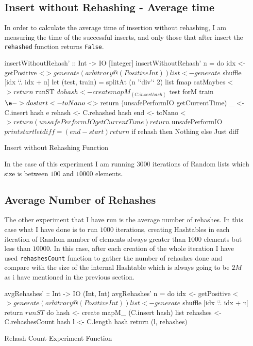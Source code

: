 \documentclass[12pt, a4paper]{article}
\begin{document}
\subsection{Insert without Rehashing - Average time}\label{sec:ins}
In order to calculate the average time of insertion without rehashing, I am measuring the time of the successful inserts, and only those that after insert the \texttt{rehashed} function returns \texttt{False}.

\begin{listing}[H]
\begin{haskellcode*}{}
insertWithoutRehash' :: Int -> IO [Integer]
insertWithoutRehash' n = do
  idx <- getPositive <$> generate (arbitrary @(Positive Int))
  list <- generate $ shuffle [idx `.`. idx + n]
  let (test, train) = splitAt (n '`div'` 2) list
  fmap catMaybes <$> return $
    runST $ do
      hash <- create
      mapM_ (C.insert hash) $ test
      forM train $ \e -> do
        start <- toNano <$> return (unsafePerformIO getCurrentTime)
        _ <- C.insert hash e
        rehash <- C.rehashed hash
        end <- toNano <$> return (unsafePerformIO getCurrentTime)
        return $ unsafePerformIO $ print start
        let diff = (end - start)
        return $
          if rehash
            then Nothing
            else Just diff
\end{haskellcode*}
\caption{Insert without Rehashing Function}
\label{lst:insertWithoutRehash}
\end{listing}

In the case of this experiment I am running $3000$ iterations of Random lists which size is between $100$ and $10000$ elements.

\subsection{Average Number of Rehashes}\label{sec:rehash}
The other experiment that I have run is the average number of rehashes. In this case what I have done is to run $1000$ iterations, creating Hashtables in each iteration of Random number of elements always greater than $1000$ elements but less than $10000$. In this case, after each creation of the whole iteration I have used \texttt{rehashesCount} function to gather the number of rehashes done and compare with the size of the internal Hashtable which is always going to be $2M$ as i have mentioned in the previous section.

\begin{listing}[H]
\begin{haskellcode*}{}
avgRehashes' :: Int -> IO (Int, Int)
avgRehashes' n = do
  idx <- getPositive <$> generate (arbitrary @(Positive Int))
  list <- generate $ shuffle [idx `.`. idx + n]
  return $
    runST $ do
      hash <- create
      mapM_ (C.insert hash) list
      rehashes <- C.rehashesCount hash
      l        <- C.length hash
      return (l, rehashes)
\end{haskellcode*}
\caption{Rehash Count Experiment Function}
\label{lst:avgRehashes}
\end{listing}
\end{document}
